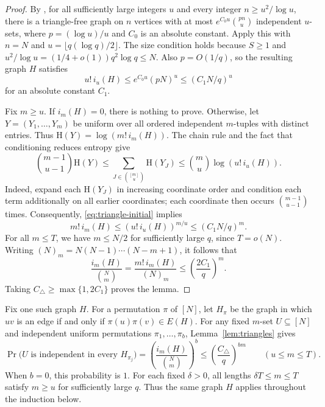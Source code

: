 \documentclass[11pt,a4paper]{article}
\numberwithin{equation}{section}
\newcommand{\HH}{\mathrm H}
\begin{document}
\begin{proof}
By \cite[Theorem~1.3]{ACM}, for all sufficiently large integers $u$
and every integer $n\ge u^2/\log u$, there is a triangle-free graph
on $n$ vertices with at most
$e^{C_0u}\binom{pn}{u}$ independent $u$-sets, where
$p=(\log u)/u$ and $C_0$ is an absolute constant.
Apply this with $n=N$ and $u=\lfloor q(\log q)/2\rfloor$.
The size condition holds because $S\ge1$ and
$u^2/\log u=(1/4+o(1))q^2\log q\le N$.
Also $p=O(1/q)$, so the resulting graph $H$ satisfies
\begin{equation}\label{eq:triangle-initial}
 u!\,i_u(H)\le e^{C_0u}(pN)^u\le(C_1N/q)^u
\end{equation}
for an absolute constant $C_1$.

Fix $m\ge u$. If $i_m(H)=0$, there is nothing to prove.
Otherwise, let $Y=(Y_1,\ldots,Y_m)$ be uniform over all ordered
independent $m$-tuples with distinct entries. Thus
$\HH(Y)=\log(m!\,i_m(H))$.
The chain rule and the fact that conditioning reduces entropy give
\[
 \binom{m-1}{u-1}\HH(Y)
 \le\sum_{J\in\binom{[m]}u}\HH(Y_J)
 \le\binom mu\log(u!\,i_u(H)).
\]
Indeed, expand each $\HH(Y_J)$ in increasing coordinate order and
condition each term additionally on all earlier coordinates;
each coordinate then occurs $\binom{m-1}{u-1}$ times.
Consequently, \eqref{eq:triangle-initial} implies
\begin{equation}\label{eq:triangle-larger}
 m!\,i_m(H)\le(u!\,i_u(H))^{m/u}\le(C_1N/q)^m.
\end{equation}
For all $m\le T$, we have $m\le N/2$ for sufficiently large $q$,
since $T=o(N)$. Writing $(N)_m=N(N-1)\cdots(N-m+1)$, it follows that
\[
 \frac{i_m(H)}{\binom Nm}
 =\frac{m!\,i_m(H)}{(N)_m}
 \le\left(\frac{2C_1}{q}\right)^m.
\]
Taking $C_\triangle\ge\max\{1,2C_1\}$ proves the lemma.
\end{proof}

Fix one such graph $H$. For a permutation $\pi$ of $[N]$, let
$H_\pi$ be the graph in which $uv$ is an edge if and only if
$\pi(u)\pi(v)\in E(H)$.
For any fixed $m$-set $U\subseteq[N]$ and independent uniform
permutations $\pi_1,\ldots,\pi_b$, Lemma~\ref{lem:triangles} gives
\begin{equation}\label{eq:triangle-permutations}
 \Pr\bigl(U\text{ is independent in every }H_{\pi_j}\bigr)
 =\left(\frac{i_m(H)}{\binom Nm}\right)^b
 \le\left(\frac{C_\triangle}{q}\right)^{bm}
 \qquad(u\le m\le T).
\end{equation}
When $b=0$, this probability is $1$.
For each fixed $\delta>0$, all lengths $\delta T\le m\le T$
satisfy $m\ge u$ for sufficiently large $q$.
Thus the same graph $H$ applies throughout the induction below.
\end{document}
